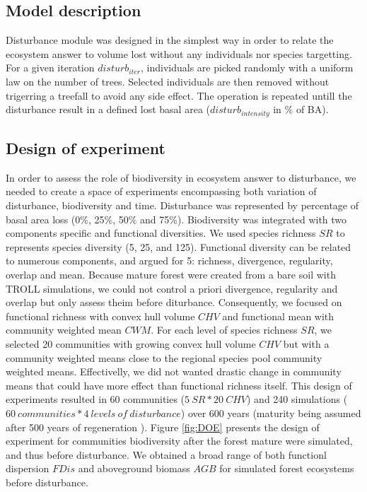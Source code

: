 \documentclass[]{article}
\theoremstyle{definition}
\theoremstyle{definition}
\theoremstyle{remark}
\begin{document}
\subsection{Model description}\label{model-description-1}

Disturbance module was designed in the simplest way in order to relate
the ecosystem answer to volume lost without any individuals nor species
targetting. For a given iteration \(disturb_{iter}\), individuals are
picked randomly with a uniform law on the number of trees. Selected
individuals are then removed without trigerring a treefall to avoid any
side effect. The operation is repeated untill the disturbance result in
a defined lost basal area (\(disturb_{intensity}\) in \% of BA).

\subsection{Design of experiment}\label{design-of-experiment}

In order to assess the role of biodiversity in ecosystem answer to
disturbance, we needed to create a space of experiments encompassing
both variation of disturbance, biodiversity and time. Disturbance was
represented by percentage of basal area loss (0\%, 25\%, 50\% and 75\%).
Biodiversity was integrated with two components specific and functional
diversities. We used species richness \(SR\) to represents species
diversity (5, 25, and 125). Functional diversity can be related to
numerous components, and \citet{Borgy2017} argued for 5: richness,
divergence, regularity, overlap and mean. Because mature forest were
created from a bare soil with TROLL simulations, we could not control a
priori divergence, regularity and overlap but only assess theim before
diturbance. Consequently, we focused on functional richness with convex
hull volume \(CHV\) and functional mean with community weighted mean
\(CWM\). For each level of species richness \(SR\), we selected 20
communities with growing convex hull volume \(CHV\) but with a community
weighted means close to the regional species pool community weighted
means. Effectivelly, we did not wanted drastic change in community means
that could have more effect than functional richness itself. This design
of experiments resulted in 60 communities (\(5~SR*20~CHV\)) and 240
simulations (\(60 ~communities*4~levels~of~disturbance\)) over 600 years
(maturity being assumed after 500 years of regeneration \citep{Li}).
Figure \ref{fig:DOE} presents the design of experiment for communities
biodiversity after the forest mature were simulated, and thus before
disturbance. We obtained a broad range of both functionl dispersion
\(FDis\) and aboveground biomass \(AGB\) for simulated forest ecosystems
before disturbance.
\end{document}

